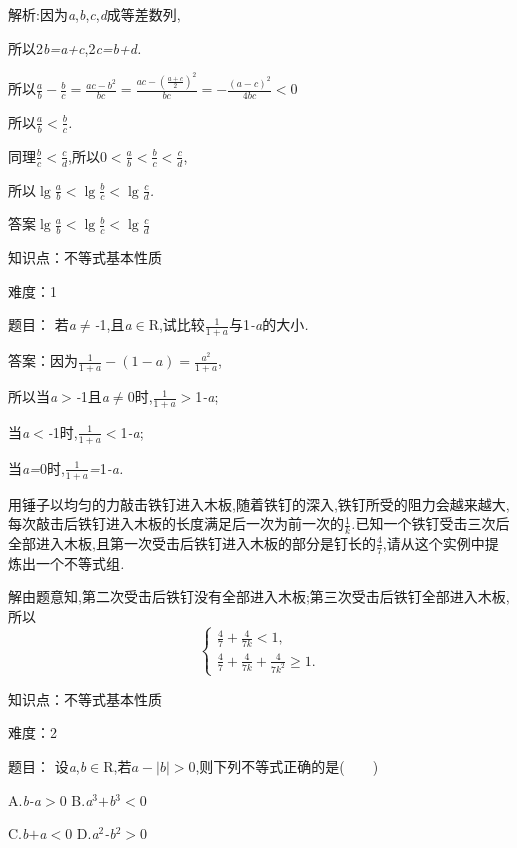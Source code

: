\documentclass{article} %
\begin{document}
 解析:因为\textit{a},\textit{b},\textit{c},\textit{d}成等差数列,

所以2\textit{b=a+c},2\textit{c=b+d.}

所以$\frac{a}{b}-\frac{b}{c}=\frac{ac-b^2}{bc}=\frac{ac-(\frac{a+c}{2})^2}{bc}=-\frac{(a-c)^2}{4bc}<0 $

所以$ \frac{a}{b}< \frac{b}{c}$\textit{.}

同理$ \frac{b}{c}< \frac{c}{d}$,所以$ 0<\frac{a}{b}<\frac{b}{c}<\frac{c}{d}$,

所以$\lg\frac{a}{b}< \lg\frac{b}{c}< \lg\frac{c}{d}$\textit{.}

 答案$\lg\frac{a}{b}< \lg\frac{b}{c}< \lg\frac{c}{d}$

知识点：不等式基本性质

难度：1

题目： 
若\textit{a}$\mathrm{\neq}$\textit{-}1,且\textit{a}$\mathrm{\in}$R,试比较$\frac{1}{1+a}$与1\textit{-a}的大小\textit{.}

 答案：因为$\frac{1}{1+a}-(1-a)=\frac{a^2}{1+a}$,

所以当\textit{a$>$-}1且\textit{a}$\mathrm{\neq}$0时,\textit{$\frac{1}{1+a}>$}1\textit{-a};

当\textit{a$<$-}1时,\textit{$\frac{1}{1+a}<$}1\textit{-a};

当\textit{a=}0时,\textit{$\frac{1}{1+a}$=}1\textit{-a.}

 
用锤子以均匀的力敲击铁钉进入木板,随着铁钉的深入,铁钉所受的阻力会越来越大,每次敲击后铁钉进入木板的长度满足后一次为前一次的$\frac{1}{k}$\textit{.}已知一个铁钉受击三次后全部进入木板,且第一次受击后铁钉进入木板的部分是钉长的$\frac{4}{7}$,请从这个实例中提炼出一个不等式组\textit{.}

 解由题意知,第二次受击后铁钉没有全部进入木板;第三次受击后铁钉全部进入木板,所以
\[
\begin{cases}
\frac{4}{7}+\frac{4}{7k}<1,\\
\frac{4}{7}+\frac{4}{7k}+\frac{4}{7k^2} \ge 1.
\end{cases}
\]



知识点：不等式基本性质

难度：2

 题目： 设\textit{a},\textit{b}$\mathrm{\in}$R,若\textit{$a-|b|>$}0,则下列不等式正确的是(\textit{　　})

 A.\textit{b-a$>$}0 B.\textit{a}${}^{3}$\textit{$+$b}${}^{3}$\textit{$<$}0

 C.\textit{b$+$a$<$}0 D.\textit{a}${}^{2}$\textit{-b}${}^{2}$\textit{$>$}0
\end{document}
